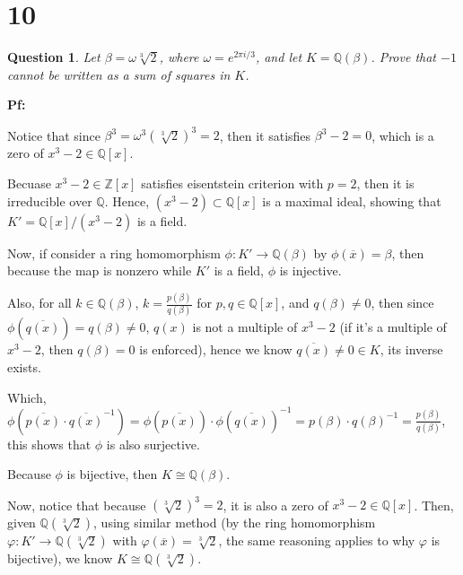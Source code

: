 \documentclass{article}
\newtheorem{question}{Question}
\begin{document}
\break

\section*{10}
\begin{myBox}[]{}
    \begin{question}
        Let $\beta=\omega \sqrt[3]{2}$, where $\omega=e^{2\pi i/3}$, and let $K=\mathbb{Q}(\beta)$. 
        Prove that $-1$ cannot be written as a sum of squares in $K$.
    \end{question}
\end{myBox}

\textbf{Pf:}

Notice that since $\beta^3=\omega^3(\sqrt[3]{2})^3 = 2$, then it satisfies $\beta^3-2=0$, which is a zero of $x^3-2\in\mathbb{Q}[x]$.

Becuase $x^3-2\in \mathbb{Z}[x]$ satisfies eisentstein criterion with $p=2$, then it is irreducible over $\mathbb{Q}$. Hence, $(x^3-2)\subset\mathbb{Q}[x]$
is a maximal ideal, showing that $K'=\mathbb{Q}[x]/(x^3-2)$ is a field.

\hfil

Now, if consider a ring homomorphism $\phi:K'\rightarrow\mathbb{Q}(\beta)$ by $\phi(\overline{x})=\beta$, then because the map is nonzero while $K'$ is a field, $\phi$ is injective.

Also, for all $k\in\mathbb{Q}(\beta)$, $k=\frac{p(\beta)}{q(\beta)}$ for $p,q\in\mathbb{Q}[x]$, and $q(\beta)\neq 0$,
then since $\phi(\overline{q(x)})=q(\beta)\neq 0$, $q(x)$ is not a multiple of $x^3-2$ (if it's a multiple of $x^3-2$, then $q(\beta)=0$ is enforced), hence we know $\overline{q(x)}\neq 0\in K$, its inverse exists.

Which, $\phi(\overline{p(x)}\cdot \overline{q(x)}^{-1})=\phi(\overline{p(x)})\cdot \phi(\overline{q(x)})^{-1} = p(\beta)\cdot q(\beta)^{-1}=\frac{p(\beta)}{q(\beta)}$, this shows that $\phi$ is also surjective.

Because $\phi$ is bijective, then $K\cong \mathbb{Q}(\beta)$.

\hfil

Now, notice that because $(\sqrt[3]{2})^3 = 2$, it is also a zero of $x^3-2\in\mathbb{Q}[x]$. Then, given $\mathbb{Q}(\sqrt[3]{2})$,
using similar method (by the ring homomorphism $\varphi:K'\rightarrow \mathbb{Q}(\sqrt[3]{2})$ with $\varphi(\overline{x})=\sqrt[3]{2}$, the same reasoning applies to why $\varphi$ is bijective), we know $K\cong \mathbb{Q}(\sqrt[3]{2})$.
\end{document}
